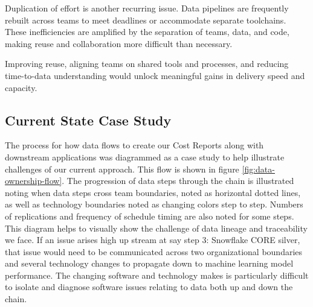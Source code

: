 \documentclass{article}
\begin{document}
Duplication of effort is another recurring issue. Data pipelines are frequently rebuilt across teams to meet deadlines or accommodate separate toolchains. These inefficiencies are amplified by the separation of teams, data, and code, making reuse and collaboration more difficult than necessary.

Improving reuse, aligning teams on shared tools and processes, and reducing time-to-data understanding would unlock meaningful gains in delivery speed and capacity.

\subsection{Current State Case Study}

The process for how data flows to create our Cost Reports along with downstream applications was diagrammed as a case study to help illustrate challenges of our current approach. This flow is shown in figure \ref{fig:data-ownership-flow}. The progression of data steps through the chain is illustrated noting when data steps cross team boundaries, noted as horizontal dotted lines, as well as technology boundaries noted as changing colors step to step. Numbers of replications and frequency of schedule timing are also noted for some steps. This diagram helps to visually show the challenge of data lineage and traceability we face. If an issue arises high up stream at say step 3: Snowflake CORE silver, that issue would need to be communicated across two organizational boundaries and several technology changes to propagate down to machine learning model performance. The changing software and technology makes is particularly difficult to isolate and diagnose software issues relating to data both up and down the chain.
\end{document}
